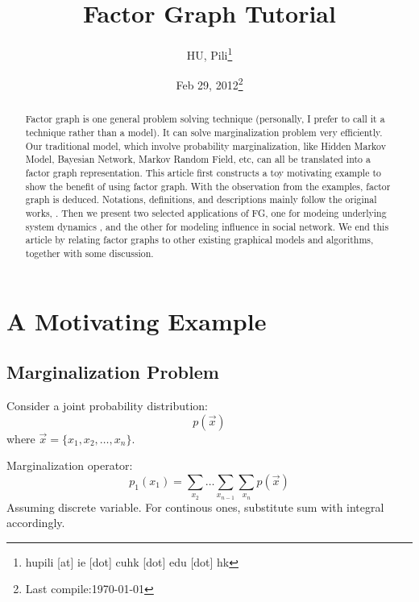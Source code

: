 


\author{HU, Pili\thanks{hupili [at] ie [dot] cuhk [dot] edu [dot] hk}}
\title{Factor Graph Tutorial}
\date{Feb 29, 2012\thanks{Last compile:\today}}



\maketitle

\begin{abstract}
	Factor graph is one general problem solving technique
	(personally, I prefer to call it a technique rather than a model). 
	It can solve marginalization problem very efficiently. 
	Our traditional model, which involve probability marginalization, 
	like Hidden Markov Model, Bayesian Network, Markov Random Field,
	etc, can all be translated into a factor graph 
	representation. This article first constructs a toy motivating 
	example to show the benefit of using factor graph. With the 
	observation from the examples, factor graph is deduced. 
	Notations, definitions, and descriptions mainly follow the original 
	works, \cite{kschischang2001factor}
	\cite{frey1997factor}. Then we present two selected applications 
	of FG, one for modeing underlying system dynamics\cite{mirowski2009dynamic}
	, and the other
	for modeling influence in social network\cite{wang2011-dynamic}. 
	We end this article by relating factor graphs to other existing 
	graphical models and algorithms, together with some discussion. 
\end{abstract}

\pagebreak
\tableofcontents
\pagebreak

\section{A Motivating Example}

\subsection{Marginalization Problem}

Consider a joint probability distribution:
\begin{equation}
	p(\vec{x})
\end{equation}
where $\vec{x}=\{x_1,x_2, \ldots, x_n\}$. 

Marginalization operator:
\begin{equation}
	p_1(x_1) = \sum_{x_2} \ldots \sum_{x_{n-1}} \sum_{x_n}p(\vec{x})
\end{equation}
Assuming discrete variable. For continous ones, substitute sum 
with integral accordingly. 

